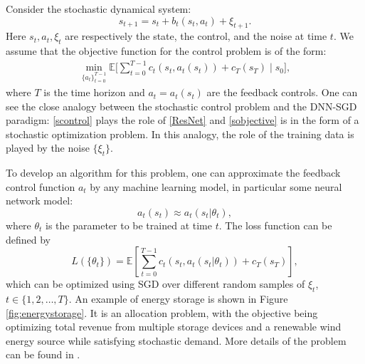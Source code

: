 \documentclass[12pt]{article}
\theoremstyle{definition}
\begin{document}
Consider the stochastic dynamical system:
\begin{equation}
  s_{t +1} = s_t+b_t(s_t,a_t)+\xi_{t +1}.
  \label{scontrol}
  \end{equation}
  Here $s_t, a_t, \xi_t $ are respectively the  state, the control, and the noise at time $t$. 
  We assume that the objective function for the control problem is of the form:
  \begin{align}
  \min_{\{a_t\}_{t =0}^{T-1}}\mathbb{E}\Big[\sum_{t =0}^{T-1} c_t(s_t,a_t(s_t))+c_T(s_T)\mid s_0\Big],
  \label{sobjective}
\end{align}
where $T$ is the time horizon and  $a_t = a_t(s_t)$ are the feedback controls. 
One can see  the close analogy between the stochastic
control problem and the DNN-SGD paradigm:  \eqref{scontrol} plays the role of \eqref{ResNet} and \eqref{sobjective} is in the
form of a stochastic optimization problem. In this analogy, the role of the training data is played by the noise $\{\xi_t\}$.

To develop an algorithm for this problem, one can  approximate the feedback control function $a_t$
by any machine learning model, in particular some neural network model:
  \begin{equation}
    a_t(s_t)\approx a_t(s_t|\theta_t),
  \end{equation}
  where $\theta_t$ is the parameter to be trained at time $t$.
  The loss function can be defined by
  \begin{equation}
 L(\{\theta_t\}) =  \mathbb{E}\!\left[\sum_{t =0}^{T-1}c_t(s_t,a_t(s_t|\theta_t))+c_T(s_T) \right],
  \end{equation}
  which can be optimized using SGD over different random samples of $ \xi_t $, $ t \in \{ 1, 2, \dots, T \} $.
%
An example of energy storage is shown in Figure \ref{fig:energystorage}.
It is an allocation
problem,  with the objective being optimizing total revenue from multiple storage devices and a renewable
wind energy source while satisfying stochastic demand.
More details of the problem can be found in \cite{HanE2016deepcontrol,jiang2015approximate}.

%
\end{document}
